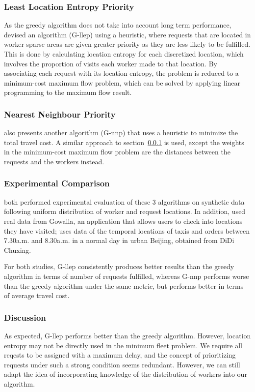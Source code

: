 \documentclass[urop]{nurop}
\begin{document}
\subsubsection{Least Location Entropy Priority}
\label{llep}
As the greedy algorithm does not take into account long term performance, \cite{kazemi} devised an algorithm (G-llep) using a heuristic, where requests that are located in worker-sparse areas are given greater priority as they are less likely to be fulfilled. This is done by calculating location entropy for each discretized location, which involves the proportion of visits each worker made to that location. By associating each request with its location entropy, the problem is reduced to a minimum-cost maximum flow problem, which can be solved by applying linear programming to the maximum flow result.

\subsubsection{Nearest Neighbour Priority}
\cite{kazemi} also presents another algorithm (G-nnp) that uses a heuristic to minimize the total travel cost. A similar approach to section~\ref{llep} is used, except the weights in the minimum-cost maximum flow problem are the distances between the requests and the workers instead.
\label{nnp}

\subsubsection{Experimental Comparison}
\cite{kazemi,cheng} both performed experimental evaluation of these 3 algorithms on synthetic data following uniform distribution of worker and request locations. In addition, \cite{kazemi} used real data from Gowalla, an application that allows users to check into locations they have visited; \cite{cheng} uses data of the temporal locations of taxis and orders between 7.30a.m. and 8.30a.m. in a normal day in urban Beijing, obtained from DiDi Chuxing.

For both studies, G-llep consistently produces better results than the greedy algorithm in terms of number of requests fulfilled, whereas G-nnp performs worse than the greedy algorithm under the same metric, but performs better in terms of average travel cost.  
\label{nnpexp}

\subsubsection{Discussion}
\label{discussion}
As expected, G-llep performs better than the greedy algorithm. However, location entropy may not be directly used in the minimum fleet problem. We require all reqests to be assigned with a maximum delay, and the concept of prioritizing requests under such a strong condition seems redundant. However, we can still adapt the idea of incorporating knowledge of the distribution of workers into our algorithm.
\end{document}
